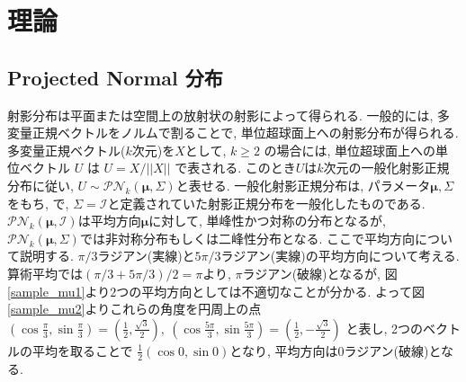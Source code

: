 \documentclass[a4paper,11pt]{jarticle}
\begin{document}

\section{理論}

\subsection{Projected Normal 分布}

射影分布は平面または空間上の放射状の射影によって得られる. 一般的には, 多変量正規ベクトルをノルムで割ることで, 単位超球面上への射影分布が得られる. 多変量正規ベクトル($k$次元)を$X$として, $k \geq 2$ の場合には, 単位超球面上への単位ベクトル $U$ は $U = X/||X||$ で表される. このとき$U$は$k$次元の一般化射影正規分布に従い, $U \sim \mathcal{PN}_k(\bm \mu,\Sigma)$と表せる. 一般化射影正規分布は, パラメータ$\bm \mu, \Sigma$をもち, \citet{PML}で, $\Sigma = \mathcal{I}$と定義されていた射影正規分布を一般化したものである. $\mathcal{PN}_k(\bm \mu,\mathcal{I})$は平均方向$\bm \mu$に対して, 単峰性かつ対称の分布となるが, $\mathcal{PN}_k(\bm \mu,\Sigma)$では非対称分布もしくは二峰性分布となる. ここで平均方向について説明する. $\pi/3$ラジアン(実線)と$5\pi/3$ラジアン(実線)の平均方向について考える. 算術平均では$(\pi/3 + 5\pi/3)/2 = \pi$より, $\pi$ラジアン(破線)となるが, 図\ref{sample_mu1}より$2$つの平均方向としては不適切なことが分かる. よって図\ref{sample_mu2}よりこれらの角度を円周上の点 $(\cos \frac{\pi}{3},\sin \frac{\pi}{3}) = (\frac{1}{2},\frac{\sqrt{3}}{2}),\ (\cos \frac{5\pi}{3}, \sin \frac{5\pi}{3}) = (\frac{1}{2},- \frac{\sqrt{3}}{2})$ と表し, 2つのベクトルの平均を取ることで $\frac{1}{2} (\cos 0, \sin 0)$となり, 平均方向は$0$ラジアン(破線)となる. 
\end{document}
